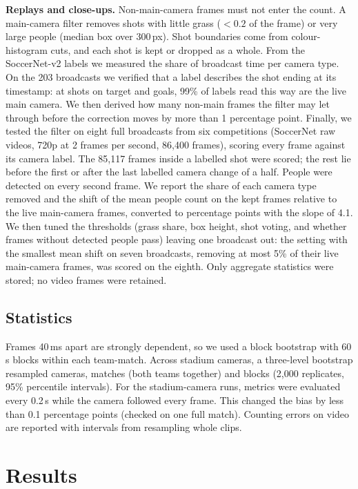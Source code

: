 \documentclass[]{interact}
\begin{document}
\textbf{Replays and close-ups.} Non-main-camera frames must not enter the count. A main-camera filter removes shots
with little grass ($<0.2$ of the frame) or very large people (median box over 300\,px). Shot boundaries come from
colour-histogram cuts, and each shot is kept or dropped as a whole. From the SoccerNet-v2 labels we measured the
share of broadcast time per camera type. On the 203 broadcasts we verified that a label describes the shot ending at
its timestamp: at shots on target and goals, 99\% of labels read this way are the live main camera. We then derived how
many non-main frames the filter may let through before the correction moves by more than 1 percentage point.
Finally, we tested the filter on eight full broadcasts from six competitions (SoccerNet raw videos, 720p at 2 frames
per second, 86{,}400 frames), scoring every frame against its camera label. The 85{,}117 frames inside a labelled
shot were scored; the rest lie before the first or after the last labelled camera change of a half. People were
detected on every second frame. We report the share of each camera type removed and the shift of the mean people count on the kept frames
relative to the live main-camera frames, converted to percentage points with the slope of 4.1. We then tuned the
thresholds (grass share, box height, shot voting, and whether frames without detected people pass) leaving one
broadcast out: the setting with the smallest mean shift on seven broadcasts, removing at most 5\% of their live
main-camera frames, was scored on the eighth. Only aggregate statistics were stored; no video frames were retained.

\subsection{Statistics}
Frames 40\,ms apart are strongly dependent, so we used a block bootstrap with 60\,s blocks within each team-match.
Across stadium cameras, a three-level bootstrap resampled cameras, matches (both teams together) and blocks
(2{,}000 replicates, 95\% percentile intervals). For the stadium-camera runs, metrics were evaluated every 0.2\,s
while the camera followed every frame. This changed the bias by less than 0.1 percentage points (checked on one full
match). Counting errors on video are reported with intervals from resampling whole clips.

\section{Results}
\end{document}
